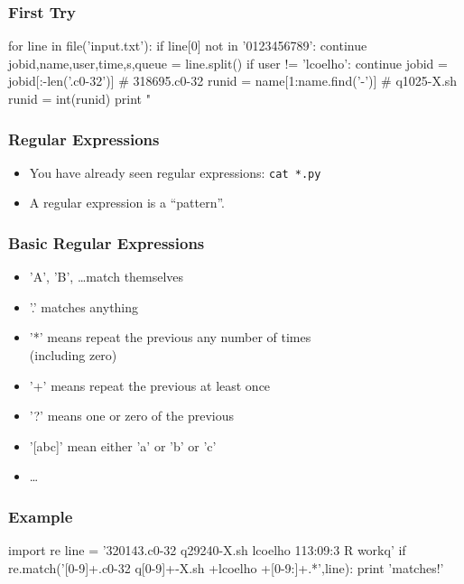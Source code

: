 \begin{frame}[fragile]
\frametitle{First Try}

\begin{python}
for line in file('input.txt'):
    if line[0] not in '0123456789':
        continue
    jobid,name,user,time,s,queue = line.split()
    if user != 'lcoelho':
        continue
    jobid = jobid[:-len('.c0-32')] # 318695.c0-32
    runid = name[1:name.find('-')] # q1025-X.sh
    runid = int(runid)
    print "%

\end{python}
\end{frame}

\begin{frame}[fragile]
\frametitle{Regular Expressions}

\begin{itemize}
\item You have already seen regular expressions:
\verb+cat *.py+
\item A regular expression is a ``pattern''.
\end{itemize}

\end{frame}

\begin{frame}[fragile]
\frametitle{Basic Regular Expressions}

\begin{itemize}
\item 'A', 'B', \ldots match themselves
\item '.' matches anything
\item '*' means repeat the previous any number of times\\
    (including zero)
\item '+' means repeat the previous at least once
\item '?' means one or zero of the previous
\item '[abc]' mean either 'a' or 'b' or 'c'
\item \ldots
\end{itemize}

\end{frame}


\begin{frame}[fragile]
\frametitle{Example}

\begin{python}
import re
line = '320143.c0-32 q29240-X.sh      lcoelho         113:09:3 R workq'
if re.match('[0-9]+.c0-32 q[0-9]+-X.sh +lcoelho +[0-9:]+.*',line):
    print 'matches!'
\end{python}

\end{frame}

